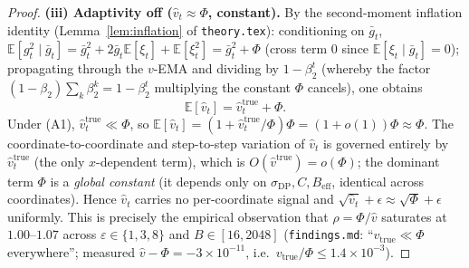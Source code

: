 \begin{proof}
\medskip
\par\smallskip\noindent\textbf{(iii) Adaptivity off ($\hat v_t\approx\Phi$, constant).}\quad 
By the second-moment inflation identity (Lemma~\ref{lem:inflation} of \texttt{theory.tex}): conditioning
on $\bar g_t$, $\mathbb E[g_t^2\mid\bar g_t]=\bar g_t^2+2\bar g_t\mathbb E[\xi_t]+\mathbb E[\xi_t^2]
=\bar g_t^2+\Phi$ (cross term $0$ since $\mathbb E[\xi_t\mid\bar g_t]=0$); propagating through the
$v$-EMA and dividing by $1-\beta_2^{t}$ (whereby the factor $(1-\beta_2)\sum_{k}\beta_2^k=1-\beta_2^t$
multiplying the constant $\Phi$ cancels), one obtains
\begin{equation}\label{eq:vhat-mean}
  \mathbb E[\hat v_t]=\hat v_t^{\mathrm{true}}+\Phi .
\end{equation}
Under (A1), $\hat v_t^{\mathrm{true}}\ll\Phi$, so $\mathbb E[\hat v_t]=(1+\hat v_t^{\mathrm{true}}/\Phi)\Phi
=(1+o(1))\Phi\approx\Phi$. The coordinate-to-coordinate and step-to-step variation of $\hat v_t$ is
governed entirely by $\hat v_t^{\mathrm{true}}$ (the only $x$-dependent term), which is
$O(\hat v^{\mathrm{true}})=o(\Phi)$; the dominant term $\Phi$ is a \emph{global constant} (it depends
only on $\sigma_{\mathrm{DP}},C,B_{\mathrm{eff}}$, identical across coordinates). Hence $\hat v_t$
carries no per-coordinate signal and $\sqrt{\hat v_t}+\epsilon\approx\sqrt\Phi+\epsilon$ uniformly.
This is precisely the empirical observation that $\rho=\Phi/\hat v$ saturates at $1.00$--$1.07$ across
$\varepsilon\in\{1,3,8\}$ and $B\in[16,2048]$ (\texttt{findings.md}: ``$v_{\mathrm{true}}\ll\Phi$
everywhere''; measured $\hat v-\Phi=-3\times10^{-11}$, i.e.\ $v_{\mathrm{true}}/\Phi\le1.4\times10^{-3}$).


\end{proof}
